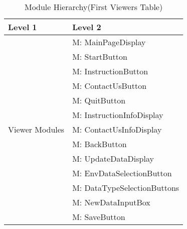 \documentclass[12pt, titlepage]{article}
\newcounter{mnum}
\newcommand{\mthemnum}{M\themnum}
\begin{document}
\begin{table}[H]
\caption{Module Hierarchy(First Viewers Table)}
\label{TblViewers1}

\centering
\begin{tabular}{p{} p{}}
\toprule
\textbf{Level 1} & \textbf{Level 2}\\
\midrule

\multirow{13}{0.3\textwidth}{Viewer Modules}
& {mnum} \mthemnum \label{Viwer1}: MainPageDisplay \\
& {mnum} \mthemnum \label{Viwer2}: StartButton \\
& {mnum} \mthemnum \label{Viwer3}: InstructionButton \\
& {mnum} \mthemnum \label{Viwer4}: ContactUsButton \\
& {mnum} \mthemnum \label{Viwer5}: QuitButton \\
& {mnum} \mthemnum \label{Viwer6}: InstructionInfoDisplay \\
& {mnum} \mthemnum \label{Viwer7}: ContactUsInfoDisplay \\ 
& {mnum} \mthemnum \label{Viwer8}: BackButton \\
& {mnum} \mthemnum \label{Viwer9}: UpdateDataDisplay \\
& {mnum} \mthemnum \label{Viwer10}: EnvDataSelectionButton \\
& {mnum} \mthemnum \label{Viwer11}: DataTypeSelectionButtons \\
& {mnum} \mthemnum \label{Viwer12}: NewDataInputBox \\
& {mnum} \mthemnum \label{Viwer13}: SaveButton \\

\bottomrule
\end{tabular}
\end{table}

\newpage
\end{document}
